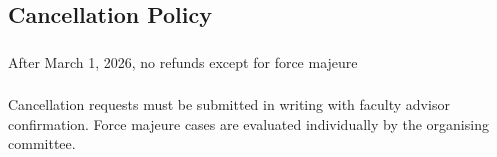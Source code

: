 \subsection{Cancellation Policy}

\subsubsection{}
After March 1, 2026, no refunds except for force majeure

\subsubsection{}
Cancellation requests must be submitted in writing with faculty advisor confirmation. Force majeure cases are evaluated individually by the organising committee.